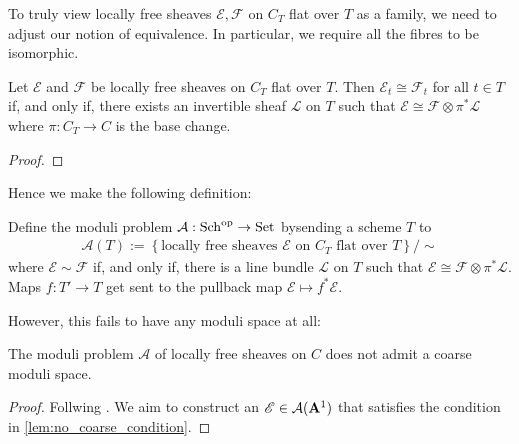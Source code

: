 \documentclass[12pt]{ociamthesis}  %
\begin{document}
To truly view locally free sheaves $\mathscr E,\mathscr F$ on
$C_T$ flat over $T$ as a family, we need to adjust our notion of
equivalence. In particular, we require all the fibres to be isomorphic.

\begin{lemma}
  Let $\mathscr E$ and $\mathscr F$ be locally free sheaves on $C_T$
  flat over $T$. Then $\mathscr E_t\cong\mathscr F_t$ for all $t\in T$
  if, and only if, there exists an invertible sheaf $\mathscr L$ on
  $T$ such that $\mathscr E \cong \mathscr F \otimes \pi^*\mathscr L$
  where $\pi : C_T \to C$ is the base change.
  \begin{proof}
    \missingproof
  \end{proof}
\end{lemma}

Hence we make the following definition:

\begin{definition}
  Define the moduli problem $\mathcal A : \operatorname{Sch}^{\text{op}} \to \operatorname{Set}$
  bysending a scheme $T$ to
  \begin{align*}
    \mathcal A(T) := \left\lbrace{\text{locally free sheaves $\mathscr E$ on $C_T$ flat over $T$}}\right\rbrace/\sim
  \end{align*}
  where $\mathscr E\sim\mathscr F$ if, and only if, there is a line bundle
  $\mathscr L$ on $T$ such that
  $\mathscr E \cong \mathscr F\otimes\pi^* \mathscr L$. Maps
  $f: T'\to T$ get sent to the pullback map
  $\mathscr E\mapsto f^*\mathscr E$.
\end{definition}

However, this fails to have any moduli space at all:

\begin{lemma}\label{lem:no_coarse_moduli_space}
  The moduli problem $\mathcal A$ of locally free sheaves on $C$
  does not admit a coarse moduli space.
  \begin{proof}
    Follwing \cite[Example 2.2]{hoskins2016}. We aim to construct
    an $\mathscr E\in\mathcal A(\mathbf{A}^{1}_{})$ that satisfies the
    condition in \ref{lem:no_coarse_condition}.
    \missingproof
  \end{proof}
\end{lemma}
\end{document}
